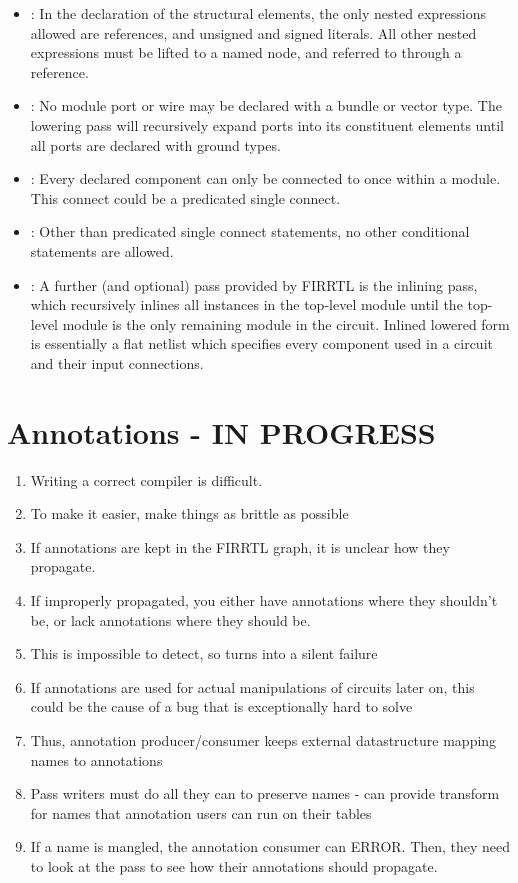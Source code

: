 \documentclass[12pt]{article}
\begin{document}
\begin{itemize}
\item {} : 
In the declaration of the structural elements, the only nested expressions allowed are references, and unsigned and signed literals.
All other nested expressions must be lifted to a named node, and referred to through a reference. 
\item {} :
No module port or wire may be declared with a bundle or vector type.
The lowering pass will recursively expand ports into its constituent elements until all ports are declared with ground types.
\item {} :
Every declared component can only be connected to once within a module.
This connect could be a predicated single connect.
\item {} :
Other than predicated single connect statements, no other conditional statements are allowed.
\item {} :
A further (and optional) pass provided by FIRRTL is the inlining pass, which recursively inlines all instances in the top-level module until the top-level module is the only remaining module in the circuit.
Inlined lowered form is essentially a flat netlist which specifies every component used in a circuit and their input connections. 
\end{itemize}

\section{Annotations - IN PROGRESS}
\begin{enumerate}[topsep=3pt,itemsep=-0.5ex,partopsep=1ex,parsep=1ex]
\item Writing a correct compiler is difficult.
\item To make it easier, make things as brittle as possible
\item If annotations are kept in the FIRRTL graph, it is unclear how they propagate.
\item If improperly propagated, you either have annotations where they shouldn't be, or lack annotations where they should be.
\item This is impossible to detect, so turns into a silent failure
\item If annotations are used for actual manipulations of circuits later on, this could be the cause of a bug that is exceptionally hard to solve
\item Thus, annotation producer/consumer keeps external datastructure mapping names to annotations
\item Pass writers must do all they can to preserve names - can provide transform for names that annotation users can run on their tables
\item If a name is mangled, the annotation consumer can ERROR. Then, they need to look at the pass to see how their annotations should propagate.
\end{enumerate}
\end{document}
